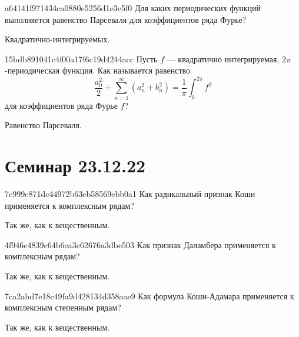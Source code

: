 \begin{note}{a64141f971434ca0880e5256d1e3e5f0}
    Для каких периодических функций выполняется равенство Парсеваля для коэффициентов ряда Фурье?

    \begin{cloze}{1}
        Квадратично-интегрируемых.
    \end{cloze}
\end{note}

\begin{note}{15bdb891041c4f00a17f6c19d4244acc}
    Пусть \({ f }\) --- квадратично интегрируемая, \({ 2\pi }\)-периодическая функция.
    Как называется равенство
    \[
        \frac{a_0^2}{2} + \sum_{n=1}^{\infty} (a_n^2 + b_n^2) = \frac{1}{\pi} \int_{0}^{2\pi} f^2
    \]
    для коэффициентов ряда Фурье \({ f }\)?

    \begin{cloze}{1}
        Равенство Парсеваля.
    \end{cloze}
\end{note}

\section{Семинар 23.12.22}
\begin{note}{7c999c871dc44972b63eb58569ebb0a1}
    Как радикальный признак Коши применяется к комплексным рядам?

    \begin{cloze}{1}
        Так же, как к вещественным.
    \end{cloze}
\end{note}

\begin{note}{4f946c4839c64b6ea3c62676a3dbe503}
    Как признак Даламбера применяется к комплексным рядам?

    \begin{cloze}{1}
        Так же, как к вещественным.
    \end{cloze}
\end{note}

\begin{note}{7ca2abd7e18c49fa9d428134d358aae9}
    Как формула Коши-Адамара применяется к комплексным степенным рядам?

    \begin{cloze}{1}
        Так же, как к вещественным.
    \end{cloze}
\end{note}

